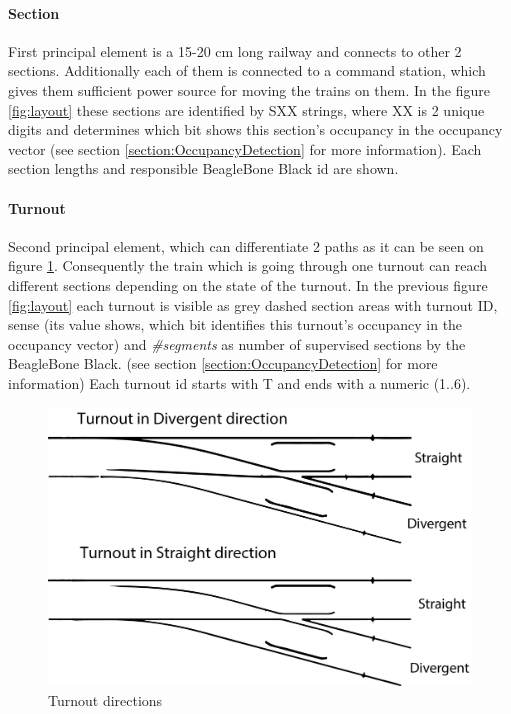 \paragraph{Section} 
First principal  element is a 15-20 cm long railway and connects to other 2 sections. Additionally each of them is connected to a command station, which gives them sufficient power source for moving the trains on them. In the figure \ref{fig:layout} these sections are identified by SXX strings, where XX is 2 unique digits and determines which bit shows this section's occupancy in the occupancy vector (see section \ref{section:OccupancyDetection} for more information). Each section lengths and responsible BeagleBone Black id are shown.

\paragraph{Turnout}
Second principal element, which can differentiate 2 paths as it can be seen on figure \ref{fig:turnoutDir}. Consequently the train which is going through one turnout can reach different sections depending on the state of the turnout. In the previous figure \ref{fig:layout} each turnout is visible as grey dashed section areas with turnout ID, sense (its value shows, which bit identifies this turnout's occupancy in the occupancy vector) and \textit{\#segments} as number of supervised sections by the BeagleBone Black. (see section \ref{section:OccupancyDetection} for more information) Each turnout id starts with T and ends with a numeric (1..6). 
\begin{figure}[!h]
	\centering
	\includegraphics[width=150mm]{figures/modes3/turnout.png}
	\caption{Turnout directions}
	\label{fig:turnoutDir}
\end{figure}

